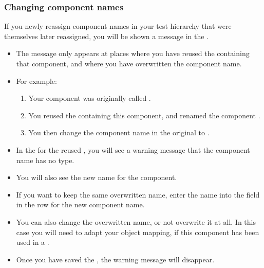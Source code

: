 \subsubsection{Changing component names}
If you newly reassign component names in  your test hierarchy that were themselves later reassigned, you will be shown a message in the \gdcompnamesview{}.
\begin{itemize}
\item The message only appears at places where you have reused the \gdcase{} containing that component, and where you have overwritten the component name. 
\item For example:
\begin{enumerate}
\item Your component was originally called .
\item You reused the \gdcase{} containing this component, and renamed the component .
\item You then change the component name in the original \gdcase{} to .
\end{enumerate}
\item In the \gdcompnamesview{} for the reused \gdcase{}, you will see a warning message that the component name has no type.
\item You will also see the new name for the component.
\item If you want to keep the same overwritten name, enter the name into the  field in the row for the new component name.
\item You can also change the overwritten name, or not overwrite it at all. In this case you will need to adapt your object mapping, if this component has been used in a \gdsuite{}. 
\item Once you have saved the \gdcompnamesview{}, the warning message will disappear. 
\end{itemize}
